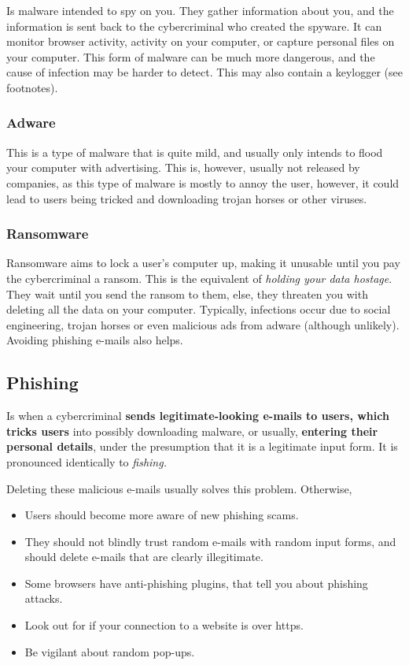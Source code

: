 \documentclass[../main.tex]{subfiles}
\begin{document}
Is malware intended to spy on you. They gather information about you, and the information is sent back to the cybercriminal who created the spyware. It can monitor browser activity, activity on your computer, or capture personal files on your computer. This form of malware can be much more dangerous, and the cause of infection may be harder to detect. This may also contain a keylogger (see footnotes).

\subsubsection{Adware}

This is a type of malware that is quite mild, and usually only intends to flood your computer with advertising. This is, however, usually not released by companies, as this type of malware is mostly to annoy the user, however, it could lead to users being tricked and downloading trojan horses or other viruses.

\subsubsection{Ransomware}

Ransomware aims to lock a user's computer up, making it unusable until you pay the cybercriminal a ransom. This is the equivalent of \emph{holding your data hostage}. They wait until you send the ransom to them, else, they threaten you with deleting all the data on your computer. Typically, infections occur due to social engineering, trojan horses or even malicious ads from adware (although unlikely). Avoiding phishing e-mails also helps.

\subsection{Phishing}

Is when a cybercriminal \textbf{sends legitimate-looking e-mails to users, which tricks users} into possibly downloading malware, or usually, \textbf{entering their personal details}, under the presumption that it is a legitimate input form. It is pronounced identically to \emph{fishing.}

Deleting these malicious e-mails usually solves this problem. Otherwise,

\begin{itemize}
    \item Users should become more aware of new phishing scams.
    \item They should not blindly trust random e-mails with random input forms, and should delete e-mails that are clearly illegitimate.
    \item Some browsers have anti-phishing plugins, that tell you about phishing attacks.
    \item Look out for if your connection to a website is over {\ccmono https}.
    \item Be vigilant about random pop-ups.
\end{itemize}
\end{document}
